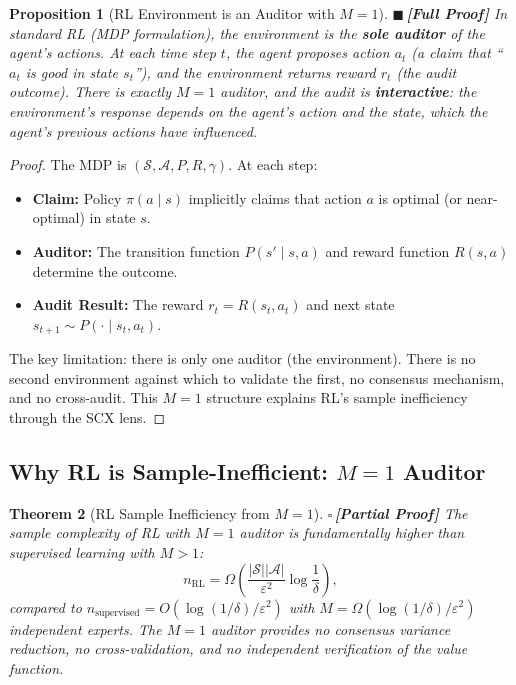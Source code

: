 \documentclass[12pt,a4paper]{article}
\newtheorem{theorem}{Theorem}[section]
\newtheorem{proposition}[theorem]{Proposition}
\theoremstyle{definition}
\newcommand{\rigorFull}{{\color{rigorcolor}$\blacksquare$\,\textbf{[Full Proof]}}}
\newcommand{\rigorPartial}{{\color{rigorcolor}$\square$\,\textbf{[Partial Proof]}}}
\newcommand{\SCX}{\textsc{SCX}}
\newcommand{\cA}{\mathcal{A}}
\newcommand{\cS}{\mathcal{S}}
\begin{document}
\begin{proposition}[RL Environment is an Auditor with $M=1$]\label{prop:rl_auditor}
\rigorFull
In standard RL (MDP formulation), the environment is the \textbf{sole auditor} of the agent's actions. At each time step $t$, the agent proposes action $a_t$ (a claim that ``$a_t$ is good in state $s_t$''), and the environment returns reward $r_t$ (the audit outcome). There is exactly $M=1$ auditor, and the audit is \textbf{interactive}: the environment's response depends on the agent's action and the state, which the agent's previous actions have influenced.
\end{proposition}

\begin{proof}
The MDP is $(\cS, \cA, P, R, \gamma)$. At each step:
\begin{itemize}[nosep]
    \item \textbf{Claim:} Policy $\pi(a \mid s)$ implicitly claims that action $a$ is optimal (or near-optimal) in state $s$.
    \item \textbf{Auditor:} The transition function $P(s' \mid s, a)$ and reward function $R(s, a)$ determine the outcome.
    \item \textbf{Audit Result:} The reward $r_t = R(s_t, a_t)$ and next state $s_{t+1} \sim P(\cdot \mid s_t, a_t)$.
\end{itemize}

The key limitation: there is only one auditor (the environment). There is no second environment against which to validate the first, no consensus mechanism, and no cross-audit. This $M=1$ structure explains RL's sample inefficiency through the \SCX{} lens.
\end{proof}

\subsection{Why RL is Sample-Inefficient: $M=1$ Auditor}

\begin{theorem}[RL Sample Inefficiency from $M=1$]\label{thm:rl_sample}
\rigorPartial
The sample complexity of RL with $M=1$ auditor is fundamentally higher than supervised learning with $M>1$:
\begin{equation}\label{eq:rl_sample_complexity}
    n_{\text{RL}} = \Omega\left(\frac{|\cS||\cA|}{\varepsilon^2} \log\frac{1}{\delta}\right),
\end{equation}
compared to $n_{\text{supervised}} = O(\log(1/\delta) / \varepsilon^2)$ with $M = \Omega(\log(1/\delta) / \varepsilon^2)$ independent experts. The $M=1$ auditor provides no consensus variance reduction, no cross-validation, and no independent verification of the value function.
\end{theorem}
\end{document}
